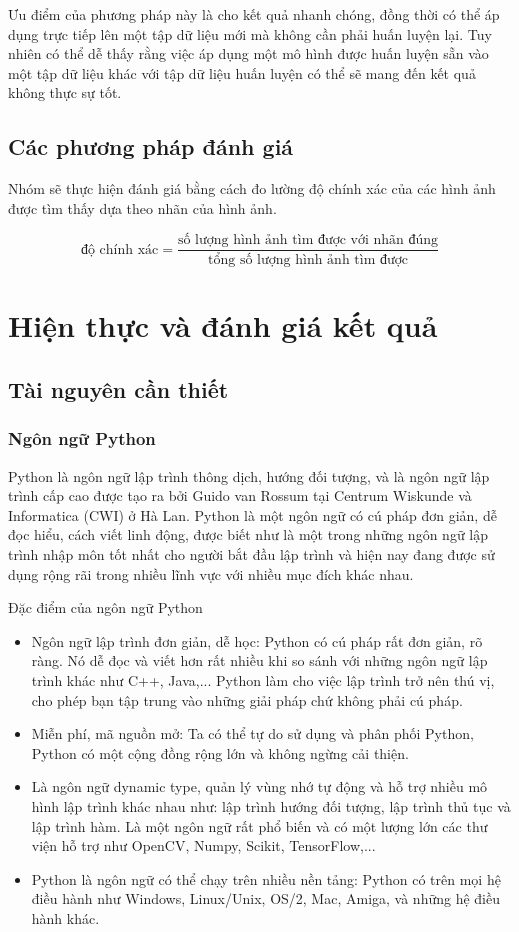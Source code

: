 \documentclass[a4paper,14pt]{extreport}
\begin{document}
Ưu điểm của phương pháp này là cho kết quả nhanh chóng, đồng thời có thể áp dụng trực tiếp lên một tập 
dữ liệu mới mà không cần phải huấn luyện lại. Tuy nhiên có thể dễ thấy rằng việc áp dụng một mô hình 
được huấn luyện sẵn vào một tập dữ liệu khác với tập dữ liệu huấn luyện có thể sẽ mang đến kết quả không thực sự tốt.


\section{ Các phương pháp đánh giá }
Nhóm sẽ thực hiện đánh giá bằng cách đo lường độ chính xác của các hình ảnh được tìm thấy dựa theo nhãn 
của hình ảnh.

\[ \text{độ chính xác} = \frac{\text{số lượng hình ảnh tìm được với nhãn đúng}}{\text{tổng số lượng hình ảnh tìm được}} \]
\chapter{Hiện thực và đánh giá kết quả}
\section{Tài nguyên cần thiết}
\subsection{Ngôn ngữ Python}
Python là ngôn ngữ lập trình thông dịch, hướng đối tượng, và là ngôn ngữ lập trình cấp cao được tạo ra bởi Guido van Rossum tại Centrum Wiskunde và Informatica (CWI) ở Hà Lan. Python là một ngôn ngữ có cú pháp đơn giản, dễ đọc hiểu, cách viết linh động, được biết như là một trong những ngôn ngữ lập trình nhập môn tốt nhất cho người bắt đầu lập trình và hiện nay đang được sử dụng rộng rãi trong nhiều lĩnh vực với nhiều mục đích khác nhau.


Đặc điểm của ngôn ngữ Python

\begin{itemize}
        \item Ngôn ngữ lập trình đơn giản, dễ học: Python có cú pháp rất đơn giản, rõ ràng. Nó dễ đọc và viết hơn rất nhiều khi so sánh với những ngôn ngữ lập trình khác như C++, Java,... Python làm cho việc lập trình trở nên thú vị, cho phép bạn tập trung vào những giải pháp chứ không phải cú pháp.
        \item Miễn phí, mã nguồn mở: Ta có thể tự do sử dụng và phân phối Python, Python có một cộng đồng rộng lớn và không ngừng cải thiện.
        \item Là ngôn ngữ dynamic type, quản lý vùng nhớ tự động và hỗ trợ nhiều mô hình lập trình khác nhau như: lập trình hướng đối tượng, lập trình thủ tục và lập trình hàm. Là một ngôn ngữ rất phổ biến và có một lượng lớn các thư viện hỗ trợ như OpenCV, Numpy, Scikit, TensorFlow,...
        \item Python là ngôn ngữ có thể chạy trên nhiều nền tảng: Python có trên mọi hệ điều hành như Windows, Linux/Unix, OS/2, Mac, Amiga, và những hệ điều hành khác.
\end{itemize}
\end{document}
